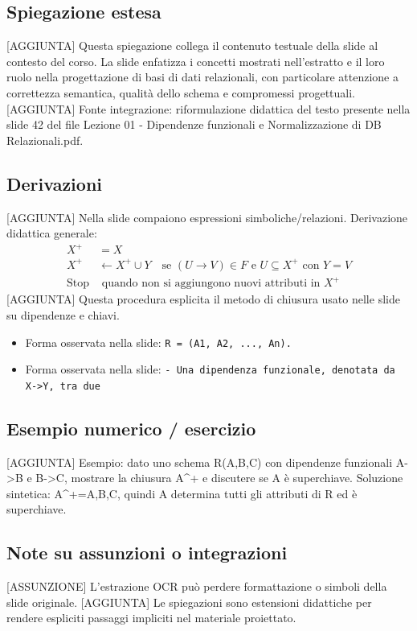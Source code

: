 \documentclass[11pt]{article}
\begin{document}
\subsection*{Spiegazione estesa}
[AGGIUNTA] Questa spiegazione collega il contenuto testuale della slide al contesto del corso. La slide enfatizza i concetti mostrati nell'estratto e il loro ruolo nella progettazione di basi di dati relazionali, con particolare attenzione a correttezza semantica, qualità dello schema e compromessi progettuali.
[AGGIUNTA] Fonte integrazione: riformulazione didattica del testo presente nella slide 42 del file Lezione 01 - Dipendenze funzionali e Normalizzazione di DB Relazionali.pdf.
\subsection*{Derivazioni}
[AGGIUNTA] Nella slide compaiono espressioni simboliche/relazioni. Derivazione didattica generale:
\begin{align*}
X^+ &= X \\
X^+ &\leftarrow X^+ \cup Y \quad \text{se } (U \to V) \in F \text{ e } U \subseteq X^+ \text{ con } Y=V \\
\text{Stop} &\text{ quando non si aggiungono nuovi attributi in } X^+
\end{align*}
[AGGIUNTA] Questa procedura esplicita il metodo di chiusura usato nelle slide su dipendenze e chiavi.
\begin{itemize}[leftmargin=*]
\item Forma osservata nella slide: \texttt{R = (A1, A2, ..., An).}
\item Forma osservata nella slide: \texttt{-    Una dipendenza funzionale, denotata da X->Y, tra due}
\end{itemize}
\subsection*{Esempio numerico / esercizio}
[AGGIUNTA] Esempio: dato uno schema R(A,B,C) con dipendenze funzionali A->B e B->C, mostrare la chiusura A^+ e discutere se A è superchiave. Soluzione sintetica: A^+={A,B,C}, quindi A determina tutti gli attributi di R ed è superchiave.
\subsection*{Note su assunzioni o integrazioni}
[ASSUNZIONE] L'estrazione OCR può perdere formattazione o simboli della slide originale.
[AGGIUNTA] Le spiegazioni sono estensioni didattiche per rendere espliciti passaggi impliciti nel materiale proiettato.
\end{document}
